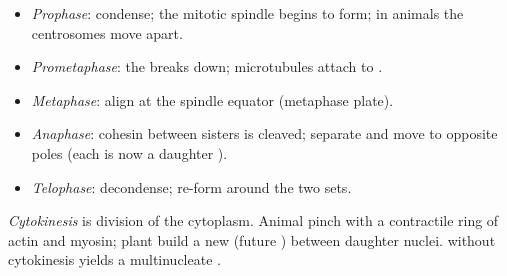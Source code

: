 \begin{proposition}\label{prop:g11:cell-cycle-mitosis:stages}
\begin{itemize}
  \item \emph{Prophase}:  condense; the mitotic
        spindle begins to form; in animals the centrosomes move apart.
  \item \emph{Prometaphase}: the  breaks
        down; microtubules attach to .
  \item \emph{Metaphase}:  align at the spindle
        equator (metaphase plate).
  \item \emph{Anaphase}: cohesin between sisters is cleaved;
         separate and move to opposite poles (each is now a
        daughter ).
  \item \emph{Telophase}:  decondense;  re-form around the two sets.
\end{itemize}
\end{proposition}
\admitted

\begin{definition}[Cytokinesis]\label{def:g11:cell-cycle-mitosis:cytokinesis}
\emph{Cytokinesis} is division of the cytoplasm. Animal 
pinch with a contractile ring of actin and myosin; plant  build a new  (future ) between daughter nuclei.  without cytokinesis
yields a multinucleate .
\end{definition}

